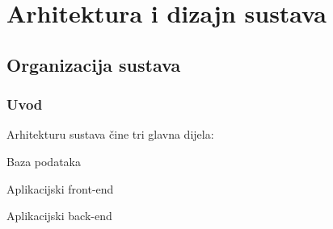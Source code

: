 \chapter{Arhitektura i dizajn sustava}
		

		
		\section{Organizacija sustava}
			\subsection{Uvod}
				Arhitekturu sustava čine tri glavna dijela:
				\begin{packed_item}
					\item Baza podataka
					\item Aplikacijski front-end
					\item Aplikacijski back-end
				\end{packed_item}
			
